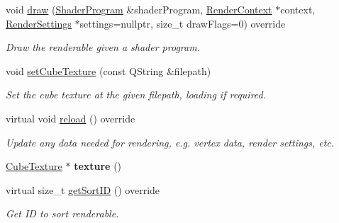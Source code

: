\begin{Indent}
\begin{DoxyCompactItemize}
\item 
\mbox{\label{classrev_1_1_cube_map_component_aab4902e9d1aed79cc37c1def2131718a}} 
void \mbox{\hyperlink{classrev_1_1_cube_map_component_aab4902e9d1aed79cc37c1def2131718a}{draw}} (\mbox{\hyperlink{classrev_1_1_shader_program}{Shader\+Program}} \&shader\+Program, \mbox{\hyperlink{classrev_1_1_render_context}{Render\+Context}} $\ast$context, \mbox{\hyperlink{classrev_1_1_render_settings}{Render\+Settings}} $\ast$settings=nullptr, size\+\_\+t draw\+Flags=0) override
\begin{DoxyCompactList}\small\item\em Draw the renderable given a shader program. \end{DoxyCompactList}\item 
\mbox{\label{classrev_1_1_cube_map_component_aeeb572c3ac6423496a3adf253c3bc0c6}} 
void \mbox{\hyperlink{classrev_1_1_cube_map_component_aeeb572c3ac6423496a3adf253c3bc0c6}{set\+Cube\+Texture}} (const Q\+String \&filepath)
\begin{DoxyCompactList}\small\item\em Set the cube texture at the given filepath, loading if required. \end{DoxyCompactList}\item 
virtual void \mbox{\hyperlink{classrev_1_1_cube_map_component_ace8f36c985acb2621b2c11b8c05b514e}{reload}} () override
\begin{DoxyCompactList}\small\item\em Update any data needed for rendering, e.\+g. vertex data, render settings, etc. \end{DoxyCompactList}\item 
\mbox{\label{classrev_1_1_cube_map_component_a12bae9c000dc757b7254e9fa0e8fa51e}} 
\mbox{\hyperlink{classrev_1_1_cube_texture}{Cube\+Texture}} $\ast$ {\bfseries texture} ()
\item 
\mbox{\label{classrev_1_1_cube_map_component_a2cdc28c911f0bc89c4258fe98a9d0382}} 
virtual size\+\_\+t \mbox{\hyperlink{classrev_1_1_cube_map_component_a2cdc28c911f0bc89c4258fe98a9d0382}{get\+Sort\+ID}} () override
\begin{DoxyCompactList}\small\item\em Get ID to sort renderable. \end{DoxyCompactList}\end{DoxyCompactItemize}
\end{Indent}
